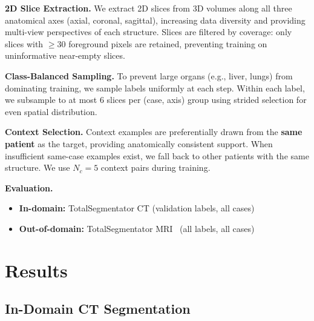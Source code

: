 \documentclass[runningheads]{llncs}
\begin{document}
\textbf{2D Slice Extraction.} We extract 2D slices from 3D volumes along all three anatomical axes (axial, coronal, sagittal), increasing data diversity and providing multi-view perspectives of each structure. Slices are filtered by coverage: only slices with $\geq 30$ foreground pixels are retained, preventing training on uninformative near-empty slices.

\textbf{Class-Balanced Sampling.} To prevent large organs (e.g., liver, lungs) from dominating training, we sample labels uniformly at each step. Within each label, we subsample to at most 6 slices per (case, axis) group using strided selection for even spatial distribution.

\textbf{Context Selection.} Context examples are preferentially drawn from the \textbf{same patient} as the target, providing anatomically consistent support. When insufficient same-case examples exist, we fall back to other patients with the same structure. We use $N_c = 5$ context pairs during training.

\textbf{Evaluation.}
\begin{itemize}
    \item \textbf{In-domain:} TotalSegmentator CT (validation labels, all cases)
    \item \textbf{Out-of-domain:} TotalSegmentator MRI~\cite{dantonoliTotalSegmentatorMRIRobust2025} (all labels, all cases)
\end{itemize}




\section{Results}
\subsection{In-Domain CT Segmentation}
\end{document}
